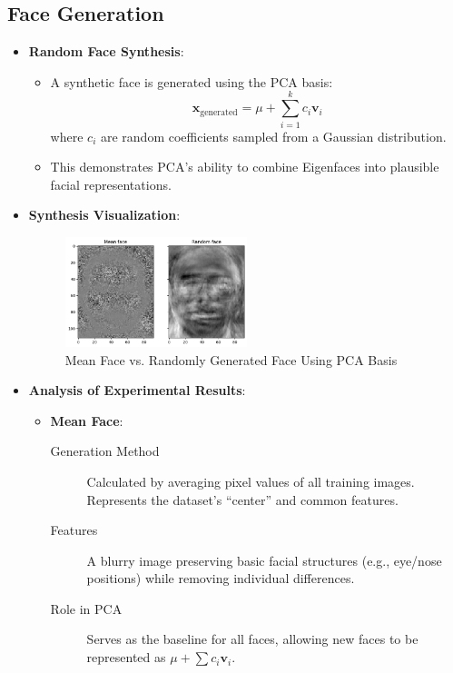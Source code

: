 \documentclass{article}
\begin{document}
	\subsection{Face Generation}
	\begin{itemize}
		\item \textbf{Random Face Synthesis}:
		\begin{itemize}
			\item A synthetic face is generated using the PCA basis:
			\[
			\mathbf{x}_{\text{generated}} = \mu + \sum_{i=1}^{k} c_i \mathbf{v}_i
			\]
			where \(c_i\) are random coefficients sampled from a Gaussian distribution.
			\item This demonstrates PCA's ability to combine Eigenfaces into plausible facial representations.
		\end{itemize}
		
		\item \textbf{Synthesis Visualization}:
		\begin{figure}[h!]
			\centering
			\includegraphics[width=0.5\textwidth]{mean_and_random_face.png}
			\caption{Mean Face vs. Randomly Generated Face Using PCA Basis}
			\label{fig:random_face}
		\end{figure}
		
		\item \textbf{Analysis of Experimental Results}:
		\begin{itemize}
			\item \textbf{Mean Face}:
			\begin{description}
				\item[Generation Method] Calculated by averaging pixel values of all training images. Represents the dataset's ``center'' and common features.
				\item[Features] A blurry image preserving basic facial structures (e.g., eye/nose positions) while removing individual differences.
				\item[Role in PCA] Serves as the baseline for all faces, allowing new faces to be represented as \(\mu + \sum c_i \mathbf{v}_i\).
			\end{description}
			

\end{itemize}
\end{itemize}
\end{document}
